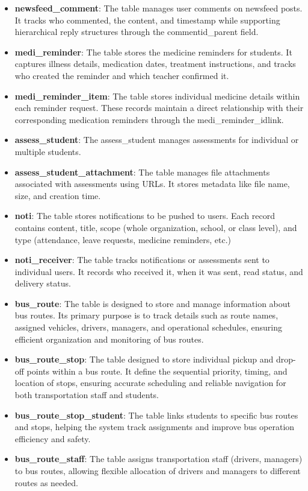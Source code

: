 \begin{itemize}[itemsep=-0.1cm]
    \item \textbf{newsfeed\_comment}: The table manages user comments on newsfeed posts. It tracks who commented, the content, and timestamp while supporting hierarchical reply structures through the commentid\_parent field.
    \item \textbf{medi\_reminder}: The table stores the medicine reminders for students. It captures illness details, medication dates, treatment instructions, and tracks who created the reminder and which teacher confirmed it.
    \item \textbf{medi\_reminder\_item}: The table stores individual medicine details within each reminder request. These records maintain a direct relationship with their corresponding medication reminders through the medi\_reminder\_idlink.
    \item \textbf{assess\_student}: The assess\_student manages assessments for individual or multiple students.
    \item \textbf{assess\_student\_attachment}: The table manages file attachments associated with assessments using URLs. It stores metadata like file name, size, and creation time.
    \item \textbf{noti}: The table stores notifications to be pushed to users. Each record contains content, title, scope (whole organization, school, or class level), and type (attendance, leave requests, medicine reminders, etc.)
    \item \textbf{noti\_receiver}: The table tracks notifications or assessments sent to individual users. It records who received it, when it was sent, read status, and delivery status.
    \item \textbf{bus\_route}: The table is designed to store and manage information about bus routes. Its primary purpose is to track details such as route names, assigned vehicles, drivers, managers, and operational schedules, ensuring efficient organization and monitoring of bus routes.
    \item \textbf{bus\_route\_stop}: The table designed to store individual pickup and drop-off points  within a bus route. It define the sequential priority, timing, and location of stops, ensuring accurate scheduling and reliable navigation for both transportation staff and students.
    \item \textbf{bus\_route\_stop\_student}: The table links students to specific bus routes and stops, helping the system track assignments and improve bus operation efficiency and safety.
    \item \textbf{bus\_route\_staff}: The table assigns transportation staff (drivers, managers) to bus routes, allowing flexible allocation of drivers and managers to different routes as needed.

\end{itemize}
